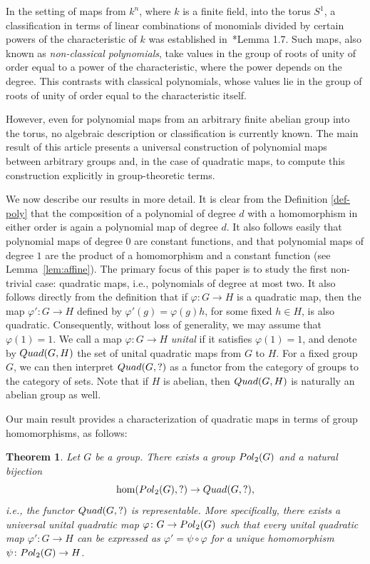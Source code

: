 \documentclass[a4paper,11pt]{amsproc}
\theoremstyle{plain}
\newtheorem{theorem}{Theorem}[section]
\theoremstyle{definition}
\begin{document}
In the setting of maps from $k^n$, where $k$ is a finite field, into the torus $S^1$, a classification in terms of linear combinations of monomials divided by certain powers of the characteristic of $k$ was established in~\cite{tz2}*{Lemma 1.7}. Such maps, also known as \emph{non-classical polynomials}, take values in the group of roots of unity of order equal to a power of the characteristic, where the power depends on the degree. This contrasts with classical polynomials, whose values lie in the group of roots of unity of order equal to the characteristic itself.

However, even for polynomial maps from an arbitrary finite abelian group into the torus, no algebraic description or classification is currently known. The main result of this article presents a universal construction of polynomial maps between arbitrary groups and, in the case of quadratic maps, to compute this construction explicitly in group-theoretic terms. 

We now describe our results in more detail. It is  clear from the Definition \ref{def-poly} that the composition of a polynomial of degree $d$ with a homomorphism in either order is again a polynomial map of degree $d$. It also follows easily that polynomial maps of degree $0$ are constant functions, and that polynomial maps of degree $1$ are the product of a homomorphism and a constant function (see Lemma~\ref{lem:affine}). The primary focus of this paper is to study the first non-trivial case: quadratic maps, i.e., polynomials of degree at most two. It also follows directly from the definition that if $\varphi \colon G \to H$ is a quadratic map, then the map $\varphi' \colon G \to H$ defined by $\varphi'(g) = \varphi(g)h$, for some fixed $h \in H$, is also quadratic. Consequently, without loss of generality, we may assume that $\varphi(1) = 1$. We call a map $\varphi \colon G \to H$ \emph{unital} if it satisfies $\varphi(1) = 1$, and denote by ${\rm Quad}(G,H)$ the set of unital quadratic maps from $G$ to $H$. 
For a fixed group $G$, we can then interpret ${\rm Quad}(G,?)$ as a functor from the category of groups to the category of sets. Note that if $H$ is abelian, then ${\rm Quad}(G,H)$ is naturally an abelian group as well.

Our main result provides a characterization of quadratic maps in terms of group homomorphisms, as follows:

\begin{theorem} \label{thm:func}
Let $G$ be a group. There exists a group ${\rm Pol}_2(G)$ and a natural bijection 
\[
\hom({\rm Pol}_2(G),?) \to {\rm Quad}(G,?),
\]
i.e., the functor ${\rm Quad}(G,?)$ is representable. More specifically, there exists a universal unital quadratic map $\varphi \colon G \to {\rm Pol}_2(G)$ such that every unital quadratic map $\varphi' \colon G \to H$ can be expressed as $\varphi' = \psi \circ \varphi$ for a unique homomorphism $\psi \colon {\rm Pol}_2(G) \to H$.
\end{theorem}
\end{document}
